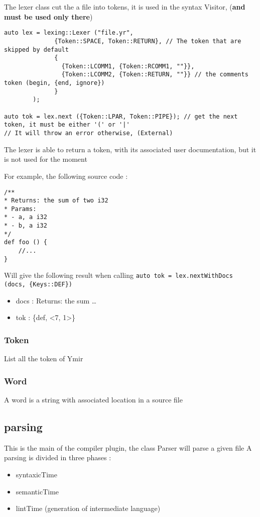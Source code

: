 \documentclass[11pt]{article}
\begin{document}
The lexer class cut the a file into tokens, it is used in the syntax Visitor, (\textbf{and must be used only there})

\begin{verbatim}
auto lex = lexing::Lexer ("file.yr", 
			  {Token::SPACE, Token::RETURN}, // The token that are skipped by default
			  {
			    {Token::LCOMM1, {Token::RCOMM1, ""}}, 
			    {Token::LCOMM2, {Token::RETURN, ""}} // the comments token (begin, {end, ignore})
			  }
	    );

auto tok = lex.next ({Token::LPAR, Token::PIPE}); // get the next token, it must be either '(' or '|'
// It will throw an error otherwise, (External)
\end{verbatim}

The lexer is able to return a token, with its associated user documentation, but it is not used for the moment

For example, the following source code : 

\begin{verbatim}
/**
* Returns: the sum of two i32
* Params: 
* - a, a i32
* - b, a i32
*/
def foo () {
    //...
}
\end{verbatim}

Will give the following result when calling \texttt{auto tok = lex.nextWithDocs (docs, \{Keys::DEF\})}
\begin{itemize}
\item docs : Returns: the sum \ldots{}
\item tok : \{def, <7, 1>\}
\end{itemize}


\subsubsection*{Token}
\label{sec:orgdc842ff}

List all the token of Ymir

\subsubsection*{Word}
\label{sec:org05fb0d0}

A word is a string with associated location in a source file

\subsection*{parsing}
\label{sec:org40473bc}

This is the main of the compiler plugin, the class Parser  will parse a given file
A parsing is divided in three phases : 
\begin{itemize}
\item syntaxicTime
\item semanticTime
\item lintTime (generation of intermediate language)
\end{itemize}
\subsection*{}
\label{sec:org9ee93d1}
\end{document}
